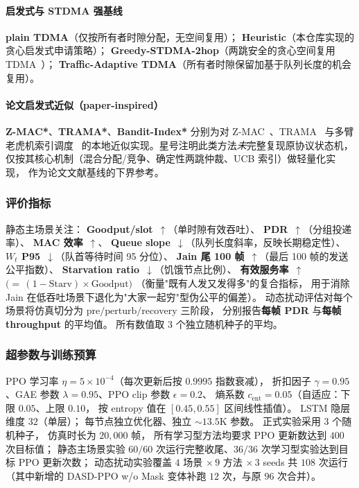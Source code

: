\paragraph{启发式与 STDMA 强基线}
\textbf{plain TDMA}（仅按所有者时隙分配，无空间复用）；
\textbf{Heuristic}（本仓库实现的贪心启发式申请策略）；
\textbf{Greedy-STDMA-2hop}（两跳安全的贪心空间复用 TDMA~\cite{stdma}）；
\textbf{Traffic-Adaptive TDMA}（所有者时隙保留加基于队列长度的机会复用）。

\paragraph{论文启发式近似（paper-inspired）}
\textbf{Z-MAC*}、\textbf{TRAMA*}、\textbf{Bandit-Index*} 分别为对
Z-MAC~\cite{zmac}、TRAMA~\cite{trama} 与多臂老虎机索引调度~\cite{bandit}
的本地近似实现。星号注明此类方法\emph{未}完整复现原协议状态机，
仅按其核心机制（混合分配/竞争、确定性两跳仲裁、UCB 索引）做轻量化实现，
作为论文文献基线的下界参考。

\subsubsection{评价指标}

静态主场景关注：
\textbf{Goodput/slot}~\(\uparrow\)（单时隙有效吞吐）、
\textbf{PDR}~\(\uparrow\)（分组投递率）、
\textbf{MAC 效率}~\(\uparrow\)、
\textbf{Queue slope}~\(\downarrow\)（队列长度斜率，反映长期稳定性）、
\textbf{\(W_t\) P95}~\(\downarrow\)（队首等待时间 95 分位）、
\textbf{Jain 尾 100 帧}~\(\uparrow\)（最后 100 帧的发送公平指数）、
\textbf{Starvation ratio}~\(\downarrow\)（饥饿节点比例）、
\textbf{有效服务率}~\(\uparrow\)~\(\big({=}\,(1-\mathrm{Starv})\times\mathrm{Goodput}\big)\)
（衡量"既有人发又发得多"的复合指标，
用于消除 Jain 在低吞吐场景下退化为"大家一起穷"型伪公平的偏差）。
动态扰动评估对每个场景将仿真切分为
\(\mathrm{pre}/\mathrm{perturb}/\mathrm{recovery}\) 三阶段，
分别报告\textbf{每帧 PDR} 与\textbf{每帧 throughput} 的平均值。
所有数值取 3 个独立随机种子的平均。

\subsubsection{超参数与训练预算}

PPO 学习率 \(\eta=5\times 10^{-4}\)（每次更新后按 \(0.9995\) 指数衰减），
折扣因子 \(\gamma=0.95\)、GAE 参数 \(\lambda=0.95\)、PPO clip 参数 \(\epsilon=0.2\)、
熵系数 \(c_{\mathrm{ent}}=0.05\)（自适应：下限 \(0.05\)、上限 \(0.10\)，
按 entropy 值在 \([0.45,0.55]\) 区间线性插值）。
LSTM 隐层维度 \(32\)（单层）；
每节点独立优化器、独立 \(\sim 13.5\)K 参数。
正式实验采用 3 个随机种子，
仿真时长为 \(20{,}000\) 帧，
所有学习型方法均要求 PPO 更新数达到 \(400\) 次目标值；
静态主场景实验 \(60/60\) 次运行完整收尾、\(36/36\) 次学习型实验达到目标 PPO 更新次数；
动态扰动实验覆盖 \(4\) 场景 \(\times\, 9\) 方法 \(\times\, 3\) seeds 共 \(108\) 次运行
（其中新增的 DASD-PPO w/o Mask 变体补跑 \(12\) 次，与原 \(96\) 次合并）。

